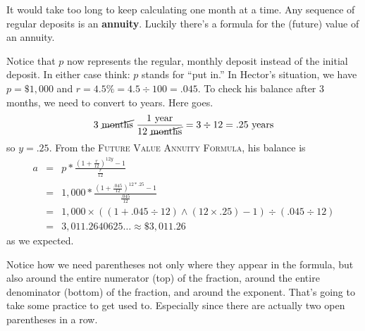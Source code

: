It would take too long to keep calculating one month at a time.  Any sequence of regular deposits is an \textbf{annuity}.  Luckily there's a formula for the (future) value of an annuity. 

 \bigskip
\bigskip

Notice that $p$ now represents the regular, monthly deposit instead of the initial deposit.  In either case think:  $p$ stands for ``put in.''  In Hector's situation, we have $p=\$1,000$ and $r=4.5\% =4.5 \div 100 =.045$.  To check his balance after 3 months, we need to convert to years.  Here goes. 
 $$3 \text{ \cancel{months} }  \frac{1 \text{ year}}{12 \text{ \cancel{months}}} =3 \div 12= .25 \text{ years}$$
 so $y = .25$.   From the  \textsc{Future Value Annuity Formula}, his balance is
\begin{eqnarray*}
a & = &  p \ast \frac{\left( 1 + \frac{r}{12}\right) ^{12y}-1}{\frac{r}{12}}\\
& = &    1,000 \ast \frac{\left( 1 + \frac{.045}{12}\right) ^{12\ast.25}-1}{\frac{.045}{12}}\\
& =  &  1,000 \times (( 1 + .045 \div 12) \wedge (12 \times .25)-1) \div (.045 \div 12)\\
& =  & 3,011.2640625\ldots  \approx \$3,011.26
\end{eqnarray*}
as we expected.

Notice how we need parentheses not only where they appear in the formula, but also around the entire numerator (top) of the fraction, around the entire denominator (bottom) of the fraction, and around the exponent.  That's going to take some practice to get used to.  Especially since there are actually two open parentheses in a row. 

